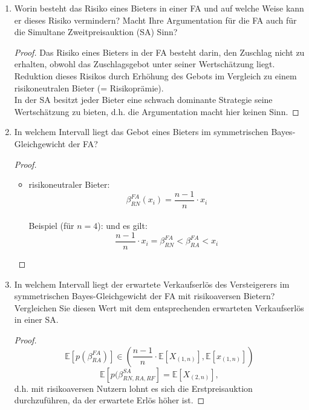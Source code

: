 \documentclass[12pt]{extreport} %
\theoremstyle{named}
\theoremstyle{itshape}
\theoremstyle{normal}
\begin{document}
\begin{enumerate}
	\item Worin besteht das Risiko eines Bieters in einer FA und auf welche Weise kann er dieses Risiko vermindern? Macht Ihre Argumentation für die FA auch für die Simultane Zweitpreisauktion (SA) Sinn?
		\begin{proof}
			Das Risiko eines Bieters in der FA besteht darin, den Zuschlag nicht zu erhalten, obwohl das Zuschlagsgebot unter seiner Wertschätzung liegt. Reduktion dieses Risikos durch Erhöhung des Gebots im Vergleich zu einem risikoneutralen Bieter (= Risikoprämie). \\
			
			In der SA besitzt jeder Bieter eine schwach dominante Strategie seine Wertschätzung zu bieten, d.h. die Argumentation macht hier keinen Sinn.
		\end{proof}
	\item In welchem Intervall liegt das Gebot eines Bieters im symmetrischen Bayes-Gleichgewicht der FA?
		\begin{proof} ~\
			\begin{itemize}
				\item risikoneutraler Bieter:
					$$ \beta_{RN}^{FA}(x_{i}) = \frac{n-1}{n} \cdot x_{i} $$ ~\\
					
				Beispiel (für $n = 4$):
    			und es gilt:
    			$$ \frac{n-1}{n} \cdot x_{i} = \beta_{RN}^{FA} < \beta_{RA}^{FA} < x_{i} $$
			\end{itemize}
		\end{proof}
	\item In welchem Intervall liegt der erwartete Verkaufserlös des Versteigerers im symmetrischen Bayes-Gleichgewicht der FA mit risikoaversen Bietern? Vergleichen Sie diesen Wert mit dem entsprechenden erwarteten Verkaufserlös in einer SA.
		\begin{proof}
			$$ \mathbb{E}\left[p\left(\beta_{RA}^{FA}\right)\right] \in \left( \frac{n-1}{n} \cdot \mathbb{E}\left[X_{(1,n)}\right], \mathbb{E}\left[x_{(1,n)}\right] \right) $$
			$$ \mathbb{E}\left[p(\beta^{SA}_{RN,RA,RF}\right] = \mathbb{E}\left[X_{(2,n)} \right], $$
			d.h. mit risikoaversen Nutzern lohnt es sich die Erstpreisauktion durchzuführen, da der erwartete Erlös höher ist.
		\end{proof}
\end{enumerate}
\end{document}

